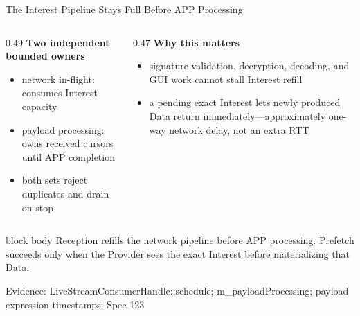 \documentclass[aspectratio=169]{beamer}
\newcommand{\bluebox}[1]{%
  \begin{beamercolorbox}[rounded=true,shadow=false,sep=0.65em,wd=0.94\linewidth]{block body}
  #1
  \end{beamercolorbox}
}
\newcommand{\evidence}[1]{%
  \vfill\par\noindent
  \begin{minipage}{\linewidth}
  \raggedright{\color{SoftGray}\tiny Evidence: #1}\par
  \end{minipage}
}
\begin{document}
\begin{frame}{The Interest Pipeline Stays Full Before APP Processing}
\scriptsize
\begin{center}
\end{center}

\vspace{0.45em}
\begin{columns}[T]
\begin{column}{0.49\textwidth}
\textbf{Two independent bounded owners}
\begin{itemize}
  \item network in-flight: consumes Interest capacity
  \item payload processing: owns received cursors until APP completion
  \item both sets reject duplicates and drain on stop
\end{itemize}
\end{column}
\begin{column}{0.47\textwidth}
\textbf{Why this matters}
\begin{itemize}
  \item signature validation, decryption, decoding, and GUI work cannot stall Interest refill
  \item a pending exact Interest lets newly produced Data return immediately---approximately one-way network delay, not an extra RTT
\end{itemize}
\end{column}
\end{columns}
\bluebox{Reception refills the network pipeline before APP processing. Prefetch succeeds only when the Provider sees the exact Interest before materializing that Data.}
\evidence{LiveStreamConsumerHandle::schedule; m\_payloadProcessing; payload expression timestamps; Spec 123}
\end{frame}
\end{document}
